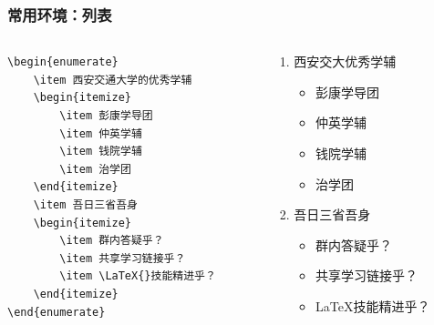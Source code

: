 \begin{frame}[fragile]
    \frametitle{常用环境：列表}
    \begin{columns}[c]
        \begin{column}{0.5\textwidth}
            \footnotesize
            \begin{lstlisting}
\begin{enumerate}
    \item 西安交通大学的优秀学辅
    \begin{itemize}
        \item 彭康学导团
        \item 仲英学辅
        \item 钱院学辅
        \item 治学团
    \end{itemize}
    \item 吾日三省吾身
    \begin{itemize}
        \item 群内答疑乎？
        \item 共享学习链接乎？
        \item \LaTeX{}技能精进乎？
    \end{itemize}
\end{enumerate}
            \end{lstlisting}
        \end{column}
        \begin{column}{0.5\textwidth}
            \begin{enumerate}
                \item 西安交大优秀学辅
                      \begin{itemize}
                          \item 彭康学导团
                          \item 仲英学辅
                          \item 钱院学辅
                          \item 治学团
                      \end{itemize}
                \item 吾日三省吾身
                      \begin{itemize}
                          \item 群内答疑乎？
                          \item 共享学习链接乎？
                          \item \LaTeX{}技能精进乎？
                      \end{itemize}
            \end{enumerate}
        \end{column}
    \end{columns}
\end{frame}

